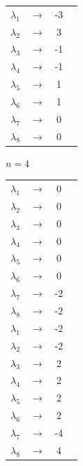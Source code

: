 \documentclass[12pt]{scrreprt}
\begin{document}
	\begin{center}
	\begin{tabular}{ c c c p{5cm} }
	$\lambda_1$ & $\rightarrow$ & -3 \\
	$\lambda_2$ & $\rightarrow$ &  3 \\
	$\lambda_3$ & $\rightarrow$ & -1 \\
	$\lambda_4$ & $\rightarrow$ & -1 \\
	$\lambda_5$ & $\rightarrow$ &  1 \\
	$\lambda_6$ & $\rightarrow$ &  1 \\
	$\lambda_7$ & $\rightarrow$ &  0 \\
	$\lambda_8$ & $\rightarrow$ &  0 \\
	\end{tabular}
	\end{center}

	\begin{center}
		$n = 4$
	\end{center}

	\vspace{.1 mm}

	\begin{center}
	\begin{tabular}{ c c c p{5cm} }
	$\lambda_1$ & $\rightarrow$ &  0 \\
	$\lambda_2$ & $\rightarrow$ &  0 \\
	$\lambda_3$ & $\rightarrow$ &  0 \\
	$\lambda_4$ & $\rightarrow$ &  0 \\
	$\lambda_5$ & $\rightarrow$ &  0 \\
	$\lambda_6$ & $\rightarrow$ &  0 \\
	$\lambda_7$ & $\rightarrow$ & -2 \\
	$\lambda_8$ & $\rightarrow$ & -2 \\
	$\lambda_1$ & $\rightarrow$ & -2 \\
	$\lambda_2$ & $\rightarrow$ & -2 \\
	$\lambda_3$ & $\rightarrow$ &  2 \\
	$\lambda_4$ & $\rightarrow$ &  2 \\
	$\lambda_5$ & $\rightarrow$ &  2 \\
	$\lambda_6$ & $\rightarrow$ &  2 \\
	$\lambda_7$ & $\rightarrow$ & -4 \\
	$\lambda_8$ & $\rightarrow$ &  4 \\
	\end{tabular}
	\end{center}
\end{document}
